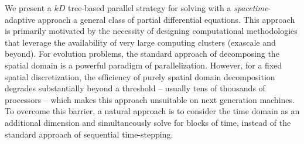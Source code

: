 
We present a $kD$ tree-based parallel strategy for solving with a {\it spacetime}-adaptive approach a general class of partial differential equations. This approach is primarily motivated by the necessity of designing computational methodologies that leverage the availability of very large computing clusters (exascale and beyond). For evolution problems, the standard approach of decomposing the spatial domain is a powerful paradigm of parallelization. However, for a fixed spatial discretization, the efficiency of purely spatial domain decomposition degrades substantially beyond a threshold -- usually tens of thousands of processors -- which makes this approach unsuitable on next generation machines. To overcome this barrier, a natural approach is to consider the time domain as an additional dimension and simultaneously solve for blocks of time, instead of the standard approach of sequential time-stepping. 


